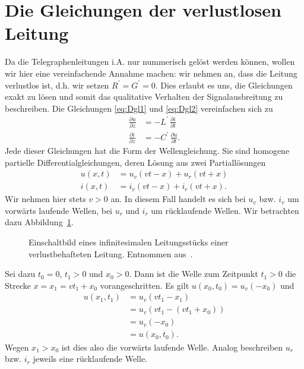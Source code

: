 \documentclass[paper=a4, parskip=half-, ngerman, fontsize=11pt]{scrreprt}
\begin{document}
\section{Die Gleichungen der verlustlosen Leitung}
\label{VerlustlosesModel}
Da die Telegraphenleitungen i.A. nur nummerisch gelöst werden können, wollen wir hier eine vereinfachende Annahme
machen: wir nehmen an, dass die Leitung verlustlos ist, d.h. wir setzen $R^{\prime} = G^{\prime} = 0$. Dies erlaubt es
uns, die Gleichungen exakt zu lösen und somit das qualitative Verhalten der Signalausbreitung zu beschreiben. Die
Gleichungen \eqref{eq:Dgl1} und \eqref{eq:Dgl2} vereinfachen sich zu
\begin{align}
    \frac{\partial u}{\partial z} &= - L^{\prime} \, \frac{\partial i}{\partial t} \label{eq:Dgl7} \\[1ex]
    \frac{\partial i}{\partial z} &= - C^{\prime} \, \frac{\partial u}{\partial t} \label{eq:Dgl8} .
\end{align}
Jede dieser Gleichungen hat die Form der Wellengleichung. Sie sind homogene partielle Differentialgleichungen, deren
Lösung aus zwei Partiallösungen
\begin{align}
u(x, t) &= u_{v}(v t - x) + u_{r}(v t + x) \label{eq:AllgEq1} \\[1ex]
i(x, t) &= i_{v}(v t - x) + i_{r}(v t + x) \label{eq:AllgEq2}.
\end{align}
Wir nehmen hier stets $v > 0$ an. In diesem Fall handelt es sich bei $u_{v}$ bzw. $i_{v}$ um
vorwärts laufende Wellen, bei $u_{r}$ und $i_{r}$ um rücklaufende Wellen. Wir betrachten dazu
Abbildung~\ref{VorwaertsWelle}.
\begin{figure}[!h]
    \begin{center}
        
        \caption{Einschaltbild eines infinitesimalen Leitungsstücks einer verlustbehafteten Leitung. Entnommen
            aus~\cite{LeitungenUndFilter}.}
        \label{VorwaertsWelle}
    \end{center}
\end{figure}
Sei dazu $t_{0} = 0$, $t_{1} > 0$ und $x_{0} > 0$. Dann ist die Welle zum Zeitpunkt $t_{1} > 0$ die Strecke $x = x_{1}
= v t_{1} + x_{0}$ vorangeschritten. Es gilt $u(x_{0}, t_{0}) = u_{v}(-x_{0})$ und
\begin{align*}
    u(x_{1}, t_{1}) &= u_{v}(v t_{1} - x_{1}) \\
                    &= u_{v}(v t_{1} - (v t_{1} + x_{0})) \\
                    &= u_{v}(- x_{0}) \\
                    &= u(x_{0}, t_{0}).
\end{align*}
Wegen $x_{1} > x_{0}$ ist dies also die vorwärts laufende Welle. Analog beschreiben $u_{r}$ bzw. $i_{r}$ jeweils eine
rücklaufende Welle.
\end{document}

